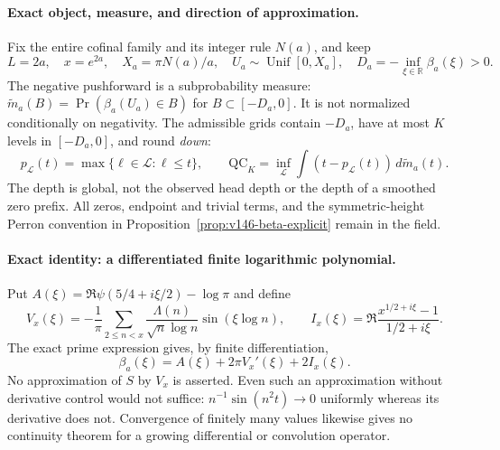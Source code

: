 \paragraph{Exact object, measure, and direction of approximation.}
Fix the entire cofinal family and its integer rule $N(a)$, and keep
\[
 L=2a,\quad x=e^{2a},\quad X_a=\pi N(a)/a,\quad
 U_a\sim\operatorname{Unif}[0,X_a],\quad
 D_a=-\inf_{\xi\in\mathbb R}\beta_a(\xi)>0.
\]
The negative pushforward is a subprobability measure:
$\widetilde m_a(B)=\Pr(\beta_a(U_a)\in B)$ for
$B\subset[-D_a,0]$. It is not normalized conditionally on negativity.
The admissible grids contain $-D_a$, have at most $K$ levels in
$[-D_a,0]$, and round \emph{down}:
\[
 p_{\mathcal L}(t)=\max\{\ell\in\mathcal L:\ell\le t\},\qquad
 \mathrm{QC}_K=\inf_{\mathcal L}\int(t-p_{\mathcal L}(t))\,d\widetilde m_a(t).
\]
The depth is global, not the observed head depth or the depth of a
smoothed zero prefix. All zeros, endpoint and trivial terms, and the
symmetric-height Perron convention in
Proposition~\ref{prop:v146-beta-explicit} remain in the field.

\paragraph{Exact identity: a differentiated finite logarithmic polynomial.}
Put $A(\xi)=\Re\psi(5/4+i\xi/2)-\log\pi$ and define
\[
 V_x(\xi)=-\frac1\pi\sum_{2\le n<x}
       \frac{\Lambda(n)}{\sqrt n\log n}\sin(\xi\log n),\qquad
 I_x(\xi)=\Re\frac{x^{1/2+i\xi}-1}{1/2+i\xi}.
\]
The exact prime expression gives, by finite differentiation,
\begin{equation}\label{ns54-selberg-eq-derivative}
             \beta_a(\xi)=A(\xi)+2\pi V_x'(\xi)+2I_x(\xi).
\end{equation}
No approximation of $S$ by $V_x$ is asserted. Even such an
approximation without derivative control would not suffice:
$n^{-1}\sin(n^2t)\to0$ uniformly whereas its derivative does not.
Convergence of finitely many values likewise gives no continuity
theorem for a growing differential or convolution operator.

